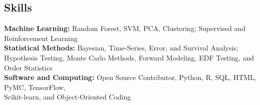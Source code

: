 \documentclass[margin,line, 12pt]{res}
\newenvironment{list2}{
  \begin{list}{$\bullet$}{%
      \setlength{\itemsep}{0.04in}
      \setlength{\parsep}{0.00in} \setlength{\parskip}{0in}
      \setlength{\topsep}{0.0in} \setlength{\partopsep}{0in}
      \setlength{\leftmargin}{0.2in}}}{\end{list}}
\begin{document}
\begin{spacing}{0.98}
\begin{resume}


\section{Skills}
\textbf{Machine Learning:} Random Forest, SVM, PCA, Clustering; Supervised and Reinforcement Learning\\ 
\textbf{Statistical Methods:} Bayesian, Time-Series, Error, and Survival Analysis; Hypothesis Testing, Monte Carlo Methods, Forward Modeling, EDF Testing, and Order Statistics\\
\textbf{Software and Computing:} Open Source Contributor, Python, R, SQL, HTML, PyMC, TensorFlow, \\ Scikit-learn, and Object-Oriented Coding \\
\vspace*{-7mm}


\end{resume}
\end{spacing}
\end{document}
